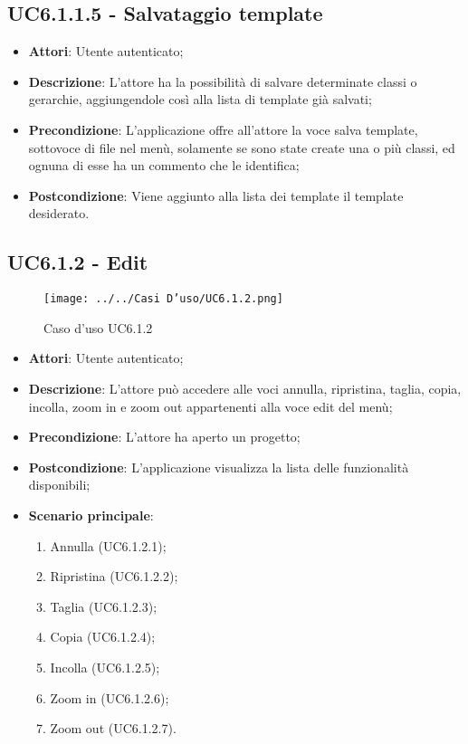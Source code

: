 \subsection{UC6.1.1.5 - Salvataggio template} 
\label{ssec:UC6.1.1.5} 
\begin{itemize} 
\item \textbf{Attori}: Utente autenticato;
\item \textbf{Descrizione}: L’attore ha la possibilità di salvare determinate classi o gerarchie, aggiungendole così alla lista di template già salvati;
\item \textbf{Precondizione}: L’applicazione offre all’attore la voce salva template, sottovoce di file nel menù, solamente se sono state create una o più classi, ed ognuna di esse ha un commento che le identifica;
\item \textbf{Postcondizione}: Viene aggiunto alla lista dei template il template desiderato.
\end{itemize} 
\newpage
\subsection{UC6.1.2 - Edit} 
\label{ssec:UC6.1.2} 
\begin{figure}[h!] 
\centering 
\texttt{[image: ../../Casi D'uso/UC6.1.2.png]} 
\caption{Caso d'uso UC6.1.2} 
 \end{figure} 
\begin{itemize} 
\item \textbf{Attori}: Utente autenticato;
\item \textbf{Descrizione}: L’attore può accedere alle voci annulla, ripristina, taglia, copia, incolla, zoom in e zoom out appartenenti alla voce edit del menù;
\item \textbf{Precondizione}: L'attore ha aperto un progetto;
\item \textbf{Postcondizione}: L’applicazione visualizza la lista delle funzionalità disponibili;
\item \textbf{Scenario principale}: \begin{enumerate}\item Annulla (UC6.1.2.1);\item Ripristina (UC6.1.2.2);\item Taglia (UC6.1.2.3);\item Copia (UC6.1.2.4);\item Incolla (UC6.1.2.5);\item Zoom in (UC6.1.2.6);\item Zoom out (UC6.1.2.7). 
 \end{enumerate}
\end{itemize} 
